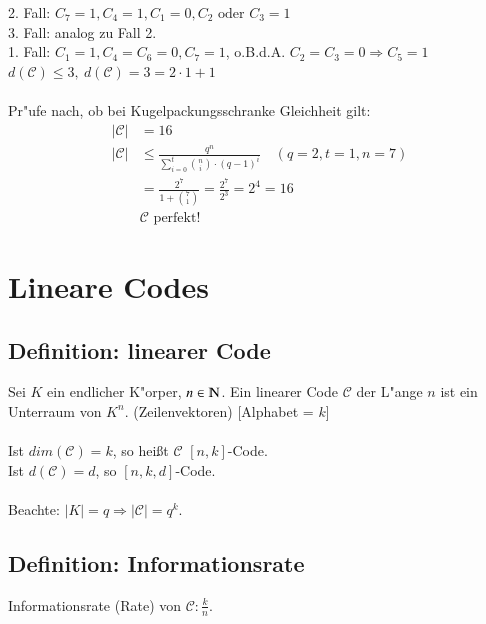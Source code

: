 2. Fall: $C_7=1,C_4=1,C_1=0,C_2 \text{ oder } C_3=1$ \\
3. Fall: analog zu Fall 2.\\
1. Fall: $C_1=1,C_4=C_6=0, C_7=1$, o.B.d.A. $C_2=C_3=0 \Rightarrow C_5=1$\\
$d(\mathcal{C}) \leq 3,\ d(\mathcal{C})=3=2 \cdot 1 + 1$\\
\\
Pr"ufe nach, ob bei Kugelpackungsschranke Gleichheit gilt:
\begin{align*}
	\left|\mathcal{C}\right| &=16\\
	\left|\mathcal{C}\right| &\leq \frac{q^n}{\sum_{i=0}^t \binom{n}{i} \cdot (q-1)^i} \quad (q=2, t=1, n=7)\\
	&=\frac{2^7}{1+\binom{7}{1}}=\frac{2^7}{2^3}=2^4=16\\
	&\mathcal{C}\text{ perfekt!}
\end{align*}

\section{Lineare Codes}
\subsection{Definition: linearer Code}
Sei $K$ ein endlicher K"orper, $n \in \N$. Ein linearer Code $\mathcal{C}$ der L"ange $n$ ist ein Unterraum von $K^n$. (Zeilenvektoren) [Alphabet = $k$] \\
\\
Ist $dim(\mathcal{C})=k$, so hei\ss t $\mathcal{C}$ $\left[n,k\right]$-Code.\\
Ist $d(\mathcal{C})=d$, so $\left[ n,k,d \right]$-Code. \\
\\
Beachte: $\left| K \right| = q \Rightarrow \left| \mathcal{C} \right| =q^k$.\\
\subsection{Definition: Informationsrate}
Informationsrate (Rate) von $\mathcal{C}: \frac{k}{n}$.\\
